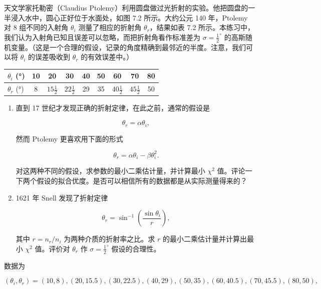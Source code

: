 \begin{question}
天文学家托勒密（Claudius
Ptolemy）利用圆盘做过光折射的实验。他把圆盘的一半浸入水中，圆心正好位于水面处，如图
7.2 所示。大约公元 140 年，Ptolemy 对 8 组不同的入射角 \(\theta_i\)
测量了相应的折射角 \(\theta_r\)，结果如表 7.2
所示。本练习中，我们认为入射角已知且误差可以忽略，而把折射角看作标准差为
\(\sigma=\frac12^\circ\)
的高斯随机变量。（这是一个合理的假设，记录的角度精确到最邻近的半度。注意，我们可以将
\(\theta_i\) 的误差吸收到 \(\theta_r\) 的有效误差中。）


\begin{center}
\begin{tabular}{lcccccccc}
\toprule
\(\theta_i\) (°) & 10 & 20 & 30 & 40 & 50 & 60 & 70 & 80 \\
\midrule
\(\theta_r\) (°) & 8 & \(15\frac12\) & \(22\frac12\) & 29 & 35 & \(40\frac12\) & \(45\frac12\) & 50 \\
\bottomrule
\end{tabular}
\par\vspace{0.25em}{\small 表 7.2: Ptolemy 折射实验的入射角和折射角，单位均为度。\par}
\end{center}

\begin{enumerate}
\item 直到 17 世纪才发现正确的折射定律，在此之前，通常的假设是

\[
\theta_r=\alpha\theta_i,
\]

然而 Ptolemy 更喜欢用下面的形式

\[
\theta_r=\alpha\theta_i-\beta\theta_i^2.
\]

对这两种不同的假设，求参数的最小二乘估计量，并计算最小 \(\chi^2\)
值。评论一下两个假设的拟合优度。是否可以相信所有的数据都是从实际测量得来的？

\item 1621 年 Snell 发现了折射定律

\[
\theta_r=\sin^{-1}\left(\frac{\sin\theta_i}{r}\right),
\]

其中 \(r=n_r/n_i\) 为两种介质的折射率之比。求 \(r\)
的最小二乘估计量并计算出最小 \(\chi^2\) 值。评价对 \(\theta_r\) 作
\(\sigma=\frac12^\circ\) 假设的合理性。
\end{enumerate}
\begin{solution}
数据为

\[
(\theta_i,\theta_r)=
(10,8),(20,15.5),(30,22.5),(40,29),(50,35),(60,40.5),(70,45.5),(80,50),
\]


\end{solution}
\end{question}
